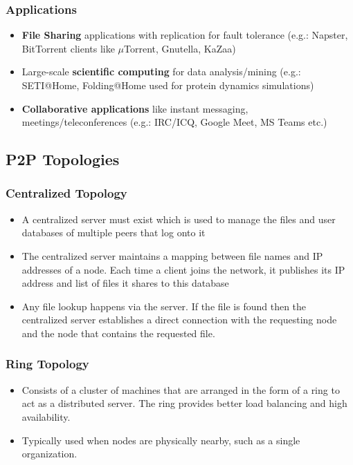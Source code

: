 \documentclass{article}
\begin{document}
\subsubsection{Applications}
\begin{itemize}
    \item \textbf{File Sharing} applications with replication for fault tolerance (e.g.: Napster, BitTorrent clients like $\mu$Torrent, Gnutella, KaZaa)
    
    \item Large-scale \textbf{scientific computing} for data analysis/mining (e.g.: SETI@Home, Folding@Home used for protein dynamics simulations)
    
    \item \textbf{Collaborative applications} like instant messaging, meetings/teleconferences (e.g.: IRC/ICQ, Google Meet, MS Teams etc.)
\end{itemize}

\subsection{P2P Topologies}
\subsubsection{Centralized Topology}
\begin{itemize}
    \item A centralized server must exist which is used to manage the files and user databases of multiple peers that log onto it
    
    \item The centralized server maintains a mapping between file names and IP addresses of a node. Each time a client joins the network, it publishes its IP address and list of files it shares to this database
    
    \item Any file lookup happens via the server. If the file is found then the centralized server establishes a direct connection with the requesting node and the node that contains the requested file.
\end{itemize}

\subsubsection{Ring Topology}
\begin{itemize}
    \item Consists of a cluster of machines that are arranged in the form of a ring to act as a distributed server. The ring provides better load balancing and high availability.
    
    \item Typically used when nodes are physically nearby, such as a single organization.
\end{itemize}
\end{document}
